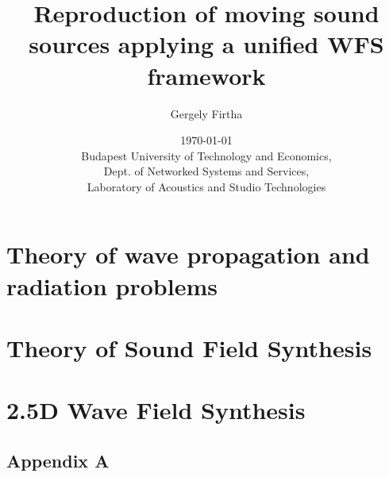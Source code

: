 \documentclass[12pt,a4paper]{report}
\title{Reproduction of moving sound sources applying a unified WFS framework}
\date{\today \\
Budapest University of Technology and Economics, \\ Dept. of Networked Systems and Services, \\ Laboratory of Acoustics and Studio Technologies}
\author{Gergely Firtha}
\begin{document}
\maketitle
\tableofcontents
\printnomenclature
%
%
%
%
\chapter{Theory of wave propagation and radiation problems}
\label{sec:theory}


\chapter{Theory of Sound Field Synthesis}
\label{sec:SFS_theory}


\chapter{2.5D Wave Field Synthesis}
\label{sec:2_5D_WFS}


\begin{appendices}
\chapter{Appendix A}

%
\end{appendices}




\end{document}
